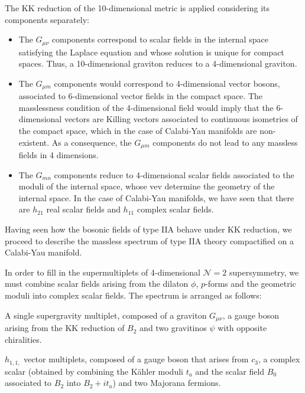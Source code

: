 The KK reduction of the 10-dimensional metric is applied considering its components separately:
\begin{itemize}
  \item The $G_{\mu\nu}$ components correspond to scalar fields in the internal space satisfying 
    the Laplace equation and whose solution is unique for compact spaces.
    Thus, a 10-dimensional graviton reduces to a 4-dimensional graviton.
  \item The $G_{\mu m}$ components would correspond to 4-dimensional vector bosons, associated
    to 6-dimensional vector fields in the compact space. 
    The masslessness condition of the 4-dimensional field would imply that the 6-dimensional 
    vectors are Killing vectors associated to continuous isometries of the compact space, which
    in the case of Calabi-Yau manifolds are non-existent.
    As a consequence, the $G_{\mu m}$ components do not lead to any massless fields in 4 dimensions.
  \item The $G_{m n}$ components reduce to 4-dimensional scalar fields associated to the moduli of the internal space,
    whose vev determine the geometry of the internal space.
    In the case of Calabi-Yau manifolds, we have seen that there are $h_{21}$ real scalar fields and
    $h_{11}$ complex scalar fields.

%
%
\end{itemize}

Having seen how the bosonic fields of type IIA behave under KK reduction, we proceed to describe the
massless spectrum of type IIA theory compactified on a Calabi-Yau manifold.

In order to fill in the supermultiplets of 4-dimensional $\mathcal N=2$ supersymmetry,
we must combine scalar fields arising from the dilaton $\phi$, $p$-forms and the geometric
moduli into complex scalar fields.
The spectrum is arranged as follows:

A single supergravity multiplet, composed of a graviton $G_{\mu\nu}$, a gauge boson arising from the KK reduction of $B_2$ and two gravitinos $\psi$ with opposite chiralities. 

$h_{1,1,}$ vector multiplets, composed of a gauge boson that arises from $c_3$, a complex scalar (obtained by combining the Kähler moduli $t_a$ and the scalar field $B_0$ associated to $B_2$ into $B_2+it_a$) and two Majorana fermions.

